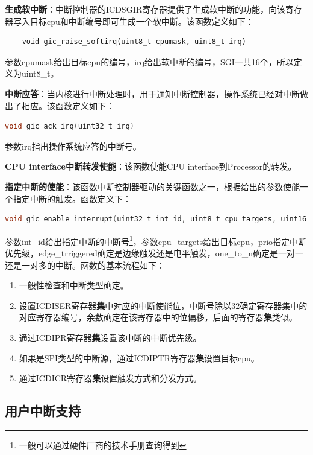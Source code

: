\documentclass[a4paper, 12pt]{report}
\begin{document}
    \textbf{生成软中断}：中断控制器的ICDSGIR寄存器提供了生成软中断的功能，向该寄存器写入目标cpu和中断编号即可生成一个软中断。该函数定义如下：
    
    \begin{lstlisting}
    void gic_raise_softirq(uint8_t cpumask, uint8_t irq)
    \end{lstlisting}
    参数cpumask给出目标cpu的编号，irq给出软中断的编号，SGI一共16个，所以定义为uint8\_t。
    
    \textbf{中断应答}：当内核进行中断处理时，用于通知中断控制器，操作系统已经对中断做出了相应。该函数定义如下：
    
    \begin{lstlisting}[language=C]
    void gic_ack_irq(uint32_t irq)
    \end{lstlisting}
    参数irq指出操作系统应答的中断号。
    
    \textbf{CPU interface中断转发使能}：该函数使能CPU interface到Processor的转发。
    
    \textbf{指定中断的使能}：该函数中断控制器驱动的关键函数之一，根据给出的参数使能一个指定中断的触发。函数定义下：
    
    \begin{lstlisting}[language=C]
    void gic_enable_interrupt(uint32_t int_id, uint8_t cpu_targets, uint16_t prio, bool edge_triggered, bool one_to_n)
    \end{lstlisting}
    参数int\_id给出指定中断的中断号\footnote{一般可以通过硬件厂商的技术手册查询得到}，参数cpu\_targets给出目标cpu，prio指定中断优先级，edge\_trriggered确定是边缘触发还是电平触发，one\_to\_n确定是一对一还是一对多的中断。函数的基本流程如下：
    
    \begin{enumerate}
        \item 一般性检查和中断类型确定。
        \item 设置ICDISER寄存器\textbf{集}中对应的中断使能位，中断号除以32确定寄存器集中的对应寄存器编号，余数确定在该寄存器中的位偏移，后面的寄存器\textbf{集}类似。
        \item 通过ICDIPR寄存器\textbf{集}设置该中断的中断优先级。
        \item 如果是SPI类型的中断源，通过ICDIPTR寄存器\textbf{集}设置目标cpu。
        \item 通过ICDICR寄存器\textbf{集}设置触发方式和分发方式。
    \end{enumerate}
    
    \subsection{用户中断支持}
    
\end{document}
